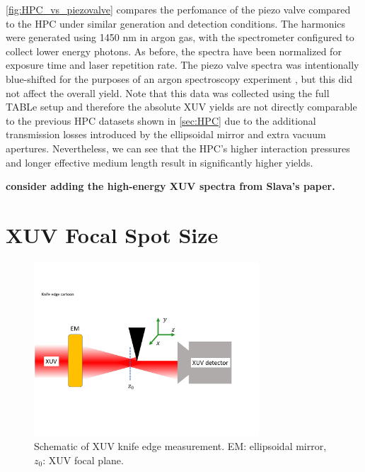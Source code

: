 \cref{fig:HPC_vs_piezovalve} compares the perfomance of the piezo valve compared to the HPC under similar generation and detection conditions. The harmonics were generated using 1450 nm in argon gas, with the spectrometer configured to collect lower energy photons. As before, the spectra have been normalized for exposure time and laser repetition rate. The piezo valve spectra was intentionally blue-shifted for the purposes of an argon spectroscopy experiment \cite{hagemanComplexAttosecondTransient2020}, but this did not affect the overall yield. Note that this data was collected using the full TABLe setup and therefore the absolute XUV yields are not directly comparable to the previous HPC datasets shown in \cref{sec:HPC} due to the additional transmission losses introduced by the ellipsoidal mirror and extra vacuum apertures. Nevertheless, we can see that the HPC's higher interaction pressures and longer effective medium length result in significantly higher yields.



\textbf{consider adding the high-energy XUV spectra from Slava's paper.}

\section{XUV Focal Spot Size}
\label{sec:XUV_knife_edge}

\begin{figure}
	\centering
	\includegraphics[width=0.75\textwidth]{figures/chap3/knife_edge_cartoon.pdf}
	\caption{Schematic of XUV knife edge measurement. EM: ellipsoidal mirror, $z_0$: XUV focal plane.}
	\label{fig:knife_edge_cartoon}
\end{figure}

